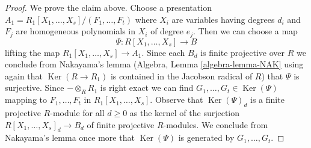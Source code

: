 \documentclass{stacks-project}
\theoremstyle{plain}
\theoremstyle{definition}
\theoremstyle{remark}
\numberwithin{equation}{subsection}
\def\Ker{\mathop{\mathrm{Ker}}}
\begin{document}
\begin{proof}
\medskip\noindent
We prove the claim above.
Choose a presentation $A_1 = R_1[X_1, \ldots, X_s]/(F_1, \ldots, F_t)$
where $X_i$ are variables having degrees $d_i$ and $F_j$
are homogeneous polynomials in $X_i$ of degree $e_j$.
Then we can choose a map
$$
\Psi : R[X_1, \ldots, X_s] \longrightarrow B
$$
lifting the map $R_1[X_1, \ldots, X_s] \to A_1$. Since each $B_d$
is finite projective over $R$ we conclude from 
Nakayama's lemma (Algebra, Lemma \ref{algebra-lemma-NAK}
using again that $\Ker(R \to R_1)$ is contained in the Jacobson radical
of $R$) that $\Psi$ is surjective. Since $- \otimes_R R_1$ is right
exact we can find $G_1, \ldots, G_t \in \Ker(\Psi)$
mapping to $F_1, \ldots, F_t$ in $R_1[X_1, \ldots, X_s]$.
Observe that $\Ker(\Psi)_d$ is a finite projective $R$-module
for all $d \geq 0$ as the kernel of the surjection
$R[X_1, \ldots, X_s]_d \to B_d$ of finite projective $R$-modules.
We conclude from Nakayama's lemma once more that 
$\Ker(\Psi)$ is generated by $G_1, \ldots, G_t$.
\end{proof}
\end{document}

